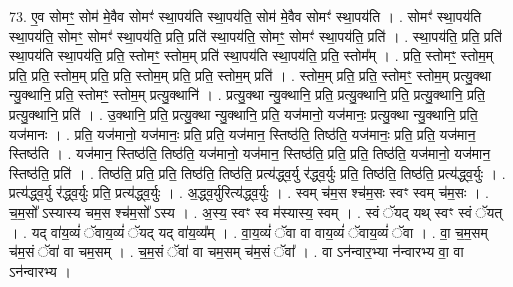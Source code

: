 \documentclass[17pt]{extarticle}
\begin{document}
73. ए॒व सोमꣳ॒॒ सोम॑ मे॒वैव सोमꣳ॑ स्था॒पय॑ति स्था॒पय॑ति॒ सोम॑ मे॒वैव सोमꣳ॑ स्था॒पय॑ति । . सोमꣳ॑ स्था॒पय॑ति स्था॒पय॑ति॒ सोमꣳ॒॒ सोमꣳ॑ स्था॒पय॑ति॒ प्रति॒ प्रति॑ स्था॒पय॑ति॒ सोमꣳ॒॒ सोमꣳ॑ स्था॒पय॑ति॒ प्रति॑ । . स्था॒पय॑ति॒ प्रति॒ प्रति॑ स्था॒पय॑ति स्था॒पय॑ति॒ प्रति॒ स्तोमꣳ॒॒ स्तोम॒म् प्रति॑ स्था॒पय॑ति स्था॒पय॑ति॒ प्रति॒ स्तोम᳚म् । . प्रति॒ स्तोमꣳ॒॒ स्तोम॒म् प्रति॒ प्रति॒ स्तोम॒म् प्रति॒ प्रति॒ स्तोम॒म् प्रति॒ प्रति॒ स्तोम॒म् प्रति॑ । . स्तोम॒म् प्रति॒ प्रति॒ स्तोमꣳ॒॒ स्तोम॒म् प्रत्यु॒क्था न्यु॒क्थानि॒ प्रति॒ स्तोमꣳ॒॒ स्तोम॒म् प्रत्यु॒क्थानि॑ । . प्रत्यु॒क्था न्यु॒क्थानि॒ प्रति॒ प्रत्यु॒क्थानि॒ प्रति॒ प्रत्यु॒क्थानि॒ प्रति॒ प्रत्यु॒क्थानि॒ प्रति॑ । . उ॒क्थानि॒ प्रति॒ प्रत्यु॒क्था न्यु॒क्थानि॒ प्रति॒ यज॑मानो॒ यज॑मानः॒ प्रत्यु॒क्था न्यु॒क्थानि॒ प्रति॒ यज॑मानः । . प्रति॒ यज॑मानो॒ यज॑मानः॒ प्रति॒ प्रति॒ यज॑मान॒ स्तिष्ठ॑ति॒ तिष्ठ॑ति॒ यज॑मानः॒ प्रति॒ प्रति॒ यज॑मान॒ स्तिष्ठ॑ति । . यज॑मान॒ स्तिष्ठ॑ति॒ तिष्ठ॑ति॒ यज॑मानो॒ यज॑मान॒ स्तिष्ठ॑ति॒ प्रति॒ प्रति॒ तिष्ठ॑ति॒ यज॑मानो॒ यज॑मान॒ स्तिष्ठ॑ति॒ प्रति॑ । . तिष्ठ॑ति॒ प्रति॒ प्रति॒ तिष्ठ॑ति॒ तिष्ठ॑ति॒ प्रत्य॑द्ध्व॒र्यु र॑द्ध्व॒र्युः प्रति॒ तिष्ठ॑ति॒ तिष्ठ॑ति॒ प्रत्य॑द्ध्व॒र्युः । . प्रत्य॑द्ध्व॒र्यु र॑द्ध्व॒र्युः प्रति॒ प्रत्य॑द्ध्व॒र्युः । . अ॒द्ध्व॒र्युरित्य॑द्ध्व॒र्युः । . स्वम् च॑म॒स श्च॑म॒सः स्वꣳ स्वम् च॑म॒सः । . च॒म॒सो᳚ ऽस्यास्य चम॒स श्च॑म॒सो᳚ ऽस्य । . अ॒स्य॒ स्वꣳ स्व म॑स्यास्य॒ स्वम् । . स्वं ॅयद् यथ् स्वꣳ स्वं ॅयत् । . यद् वा॑य॒व्यं॑ ॅवाय॒व्यं॑ ॅयद् यद् वा॑य॒व्य᳚म् । . वा॒य॒व्यं॑ ॅवा वा वाय॒व्यं॑ ॅवाय॒व्यं॑ ॅवा । . वा॒ च॒म॒सम् च॑म॒सं ॅवा॑ वा चम॒सम् । . च॒म॒सं ॅवा॑ वा चम॒सम् च॑म॒सं ॅवा᳚ । . वा ऽन॑न्वार॒भ्या न॑न्वारभ्य वा॒ वा ऽन॑न्वारभ्य । \newline
\end{document}
